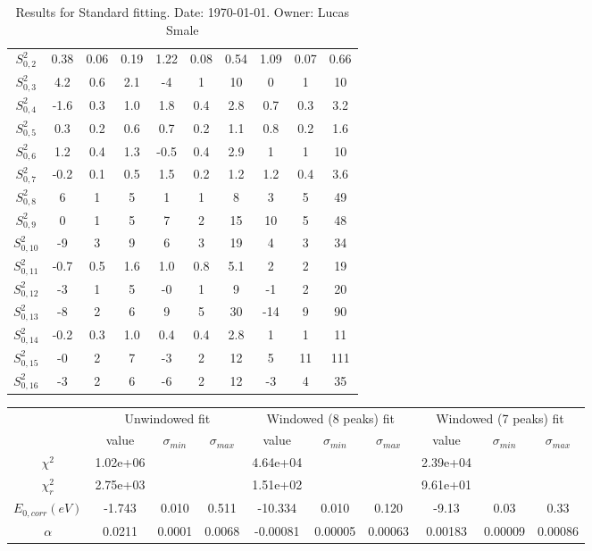 \documentclass{article}
\begin{document}
\begin{landscape}
\begin{table}[ht]
\begin{tabular}{c||c|c|c||c|c|c||c|c|c}
$S^2_{0,2}$& 0.38 & 0.06 & 0.19 & 1.22 & 0.08 & 0.54 & 1.09 & 0.07 & 0.66 \\
$S^2_{0,3}$& 4.2 & 0.6 & 2.1 & -4 & 1 & 10 & 0 & 1 & 10 \\
$S^2_{0,4}$& -1.6 & 0.3 & 1.0 & 1.8 & 0.4 & 2.8 & 0.7 & 0.3 & 3.2 \\
$S^2_{0,5}$& 0.3 & 0.2 & 0.6 & 0.7 & 0.2 & 1.1 & 0.8 & 0.2 & 1.6 \\
$S^2_{0,6}$& 1.2 & 0.4 & 1.3 & -0.5 & 0.4 & 2.9 & 1 & 1 & 10 \\
$S^2_{0,7}$& -0.2 & 0.1 & 0.5 & 1.5 & 0.2 & 1.2 & 1.2 & 0.4 & 3.6 \\
$S^2_{0,8}$& 6 & 1 & 5 & 1 & 1 & 8 & 3 & 5 & 49 \\
$S^2_{0,9}$& 0 & 1 & 5 & 7 & 2 & 15 & 10 & 5 & 48 \\
$S^2_{0,10}$& -9 & 3 & 9 & 6 & 3 & 19 & 4 & 3 & 34 \\
$S^2_{0,11}$& -0.7 & 0.5 & 1.6 & 1.0 & 0.8 & 5.1 & 2 & 2 & 19 \\
$S^2_{0,12}$& -3 & 1 & 5 & -0 & 1 & 9 & -1 & 2 & 20 \\
$S^2_{0,13}$& -8 & 2 & 6 & 9 & 5 & 30 & -14 & 9 & 90 \\
$S^2_{0,14}$& -0.2 & 0.3 & 1.0 & 0.4 & 0.4 & 2.8 & 1 & 1 & 11 \\
$S^2_{0,15}$& -0 & 2 & 7 & -3 & 2 & 12 & 5 & 11 & 111 \\
$S^2_{0,16}$& -3 & 2 & 6 & -6 & 2 & 12 & -3 & 4 & 35 \\
\hline
    \end{tabular}
    \caption{Results for Standard fitting. Date: \today. Owner: Lucas Smale}
\end{table}
\begin{table}[ht]
\centering
\begin{tabular}{c||c|c|c||c|c|c||c|c|c}
\hline
&\multicolumn{3}{|c}{Unwindowed fit}&\multicolumn{3}{|c}{Windowed (8 peaks) fit}&\multicolumn{3}{|c}{Windowed (7 peaks) fit}\\
& value & $\sigma_{min}$ & $\sigma_{max}$& value & $\sigma_{min}$ & $\sigma_{max}$& value & $\sigma_{min}$ & $\sigma_{max}$\\
\hline
$\chi^2$   & 1.02e+06 & & & 4.64e+04 & & & 2.39e+04 & & \\
$\chi^2_r$ & 2.75e+03 & & & 1.51e+02 & & & 9.61e+01 & & \\
\hline
$E_{0,corr} (eV)$& -1.743 & 0.010 & 0.511 & -10.334 & 0.010 & 0.120 & -9.13 & 0.03 & 0.33 \\
$\alpha $       & 0.0211 & 0.0001 & 0.0068 & -0.00081 & 0.00005 & 0.00063 & 0.00183 & 0.00009 & 0.00086 \\

\end{tabular}
\end{table}
\end{landscape}
\end{document}
